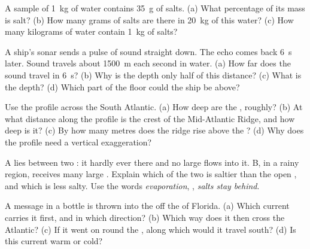 \begin{exercise}[$\star\star$]\label{exo:g8:the-oceans:5}
A sample of \qty{1}{kg} of  water contains \qty{35}{g} of salts. (a)
What percentage of its mass is salt? (b) How many grams of salts are
there in \qty{20}{kg} of this water? (c) How many kilograms of  water
contain \qty{1}{kg} of salts?
\end{exercise}

\begin{exercise}[$\star\star$]\label{exo:g8:the-oceans:6}
A ship's sonar sends a pulse of sound straight down. The echo comes back
\qty{6}{s} later. Sound travels about \qty{1500}{m} each second in 
water. (a) How far does the sound travel in \qty{6}{s}? (b) Why is the
depth only half of this distance? (c) What is the depth? (d) Which part of
the  floor could the ship be above?
\end{exercise}

\begin{exercise}[$\star\star$]\label{exo:g8:the-oceans:7}
Use the profile across the South Atlantic. (a) How deep are the , roughly? (b) At what distance along the profile is the crest of
the Mid-Atlantic Ridge, and how deep is it? (c) By how many metres does the
ridge rise above the ? (d) Why does the profile need a vertical
exaggeration?
\end{exercise}

\begin{exercise}[$\star\star$]\label{exo:g8:the-oceans:8}
 A lies between two : it hardly ever  there and no large
 flows into it.  B, in a rainy region, receives many large .
Explain which of the two is saltier than the open , and which is less
salty. Use the words \emph{evaporation}, \emph{}, \emph{salts
stay behind}.
\end{exercise}

\begin{exercise}[$\star\star$]\label{exo:g8:the-oceans:9}
A message in a bottle is thrown into the  off the  of Florida.
(a) Which current carries it first, and in which direction? (b) Which way
does it then cross the Atlantic? (c) If it went on round the , along
which  would it travel south? (d) Is this current warm or cold?
\end{exercise}

